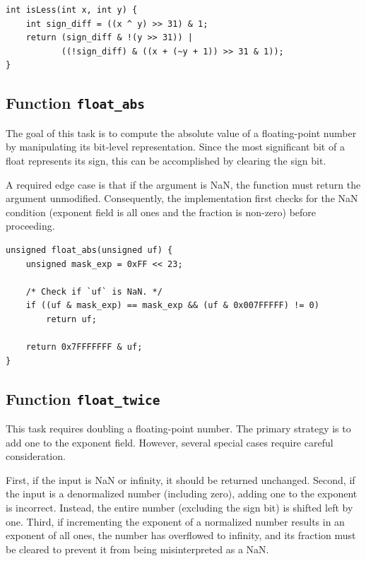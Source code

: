 \documentclass{article}
\begin{document}
\begin{verbatim}
int isLess(int x, int y) {
    int sign_diff = ((x ^ y) >> 31) & 1;
    return (sign_diff & !(y >> 31)) |
           ((!sign_diff) & ((x + (~y + 1)) >> 31 & 1));
}
\end{verbatim}

\subsection{Function \texttt{float\_abs}}

The goal of this task is to compute the absolute value of a floating-point 
number by manipulating its bit-level representation. Since the most significant 
bit of a float represents its sign, this can be accomplished by clearing the 
sign bit.

A required edge case is that if the argument is NaN, the function must return 
the argument unmodified. Consequently, the implementation first checks for the 
NaN condition (exponent field is all ones and the fraction is non-zero) before 
proceeding.

\begin{verbatim}
unsigned float_abs(unsigned uf) {
    unsigned mask_exp = 0xFF << 23;

    /* Check if `uf` is NaN. */
    if ((uf & mask_exp) == mask_exp && (uf & 0x007FFFFF) != 0)
        return uf;

    return 0x7FFFFFFF & uf;
}
\end{verbatim}

\subsection{Function \texttt{float\_twice}}

This task requires doubling a floating-point number. The primary strategy is to 
add one to the exponent field. However, several special cases require careful 
consideration.

First, if the input is NaN or infinity, it should be returned unchanged. Second, 
if the input is a denormalized number (including zero), adding one to the 
exponent is incorrect. Instead, the entire number (excluding the sign bit) is 
shifted left by one. Third, if incrementing the exponent of a normalized number 
results in an exponent of all ones, the number has overflowed to infinity, and 
its fraction must be cleared to prevent it from being misinterpreted as a NaN.
\end{document}
